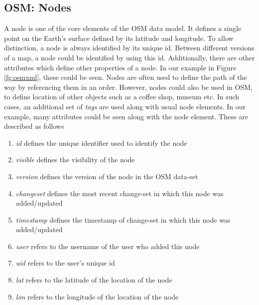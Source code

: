 \subsection{OSM: Nodes}
A node is one of the core elements of the OSM data model. It defines a single point on the Earth's surface defined by its latitude and longitude. To allow distinction, a node is always identified by its unique id. Between different versions of a map, a node could be identified by using this id. Additionally, there are other attributes which define other properties of a node. In our example in Figure \ref{fg:osmxml}, these could be seen. Nodes are often used to define the path of the way by referencing them in an order. However, nodes could also be used in OSM, to define location of other objects such as a coffee shop, museum etc. In such cases, an additional set of \textit{tags} are used along with usual node elements. In our example, many attributes could be seen along with the node element. These are described as follows
\begin{enumerate}
\item \textit{id} defines the unique identifier used to identify the node
\item \textit{visible} defines the visibility of the node
\item \textit{version} defines the version of the node in the OSM data-set
\item \textit{changeset} defines the most recent change-set in which this node was added/updated
\item \textit{timestamp} defines the timestamp of change-set in which this node was added/updated
\item \textit{user} refers to the username of the user who added this node
\item \textit{uid} refers to the user's unique id 
\item \textit{lat} refers to the latitude of the location of the node
\item \textit{lon} refers to the longitude of the location of the node
\end{enumerate}
